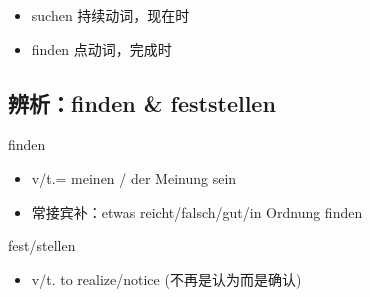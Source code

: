 \begin{itemize}
    \item suchen 持续动词，现在时
    \item finden 点动词，完成时
\end{itemize}

\subsection{辨析：finden \& feststellen}

finden
\begin{itemize}
    \item v/t.= meinen / der Meinung sein
    \item 常接宾补：etwas reicht/falsch/gut/in Ordnung finden
\end{itemize}

fest/stellen
\begin{itemize}
    \item v/t. to realize/notice (不再是认为而是确认)
\end{itemize}